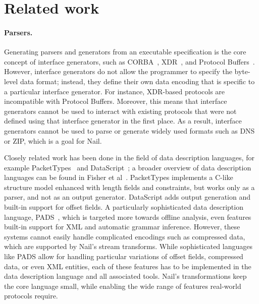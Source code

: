 \section{Related work}
\label{s:relwk}

\paragraph{Parsers.}

Generating parsers and generators from an executable specification is the
core concept of interface generators, such as CORBA~\cite{omg:corba},
XDR~\cite{RFC:1832}, and Protocol Buffers~\cite{varda2008}.  However,
interface generators do not allow the programmer to specify the byte-level
data format; instead, they define their own data encoding that is
specific to a particular interface generator.  For instance, XDR-based
protocols are incompatible with Protocol Buffers.  Moreover, this means
that interface generators cannot be used to interact with existing protocols
that were not defined using that interface generator in the first place.
As a result, interface generators cannot be used to parse or generate
widely used formats such as DNS or ZIP, which is a goal for Nail.

Closely related work has been done in the field of data description languages, for example
PacketTypes~\cite{mccann2000packet} and DataScript~\cite{back2002datascript}; a
broader overview of data description languages can be found in Fisher et
al~\cite{Fisher:700DDL}.
PacketTypes implements a C-like structure model enhanced with
length fields and constraints, but works only as a parser, and
not as an output generator.
DataScript adds output generation and built-in support for offset fields.
A particularly sophisticated data description language, PADS~\cite{Fisher:2005:PDL:1064978.1065046},
which is targeted more towards offline analysis, even features built-in support for XML and
automatic grammar inference.
However, these systems cannot easily handle complicated encodings such as compressed data, which are
supported by Nail's stream transforms. While sophisticated languages like PADS allow for handling
particular variations of offset fields, compressed data, or even XML entities, each of these
features has to be implemented in the data description language and all associated tools. Nail's
transformations keep the core language small, while enabling the wide range of
features real-world protocols require. 

